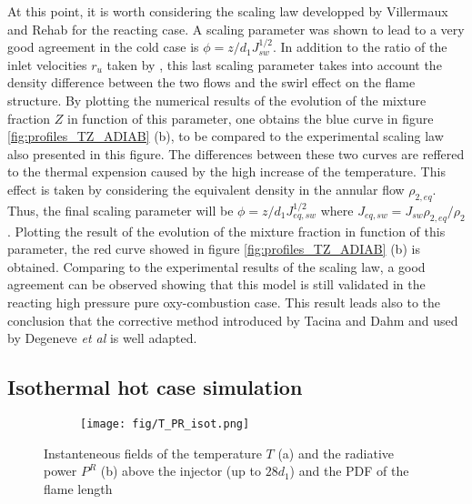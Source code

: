 \documentclass[twocolumn,10pt]{asme2e}
\begin{document}
At this point, it is worth considering the scaling law developped by Villermaux and Rehab \cite{villermaux2000mixing} for the reacting case. A scaling parameter was shown to lead to a very good agreement in the cold case is $\phi=z/d_1 J^{1/2}_{sw}$. In addition to the ratio of the inlet velocities $r_u$ taken by \cite{villermaux2000mixing}, this last scaling parameter takes into account the density difference between the two flows and the swirl effect on the flame structure. By plotting the numerical results of the evolution of the mixture fraction $Z$ in function of this parameter, one obtains the blue curve in figure \ref{fig:profiles_TZ_ADIAB} (b), to be compared to the experimental scaling law also presented in this figure. The differences between these two curves are reffered to the thermal expension caused by the high increase of the temperature. This effect is taken by considering the equivalent density in the annular flow $\rho_{2,eq}$.  Thus, the final scaling parameter will be $\phi=z/d_1 J^{1/2}_{eq,sw}$ where $J_{eq,sw}=J_{sw} \rho_{2,eq}/\rho_2$. Plotting the result of the evolution of the mixture fraction in function of this parameter, the red curve showed in figure \ref{fig:profiles_TZ_ADIAB} (b) is obtained. Comparing to the experimental results of the scaling law, a good agreement can be observed showing that this model is still validated in the reacting high pressure pure oxy-combustion case. This result leads also to the conclusion that the corrective method introduced by Tacina and Dahm \cite{tacina2000effects} and used by Degeneve \textit{et al} \cite{degeneve2019scaling} is well adapted. 
 
 
\subsection*{Isothermal hot case simulation}

\begin{figure}
   \begin{subfigure}[b]{1\linewidth}        %
       \centering
       \texttt{[image: fig/T\_PR\_isot.png]}
   \end{subfigure}
      \caption{ Instanteneous fields of the temperature $T$ (a) and the radiative power $P^{R}$ (b) above the injector (up to $28 d_1$) and the PDF of the flame length }
   \label{fig:fields_TPr_ISOT}
   \vspace{-0.05 cm}
\end{figure}
\end{document}
